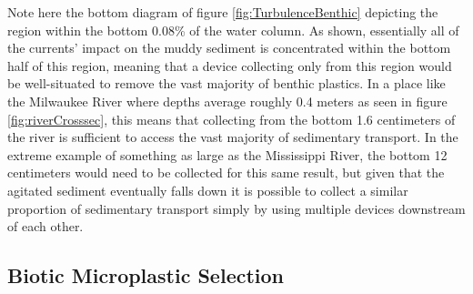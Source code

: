 \documentclass[fleqn,10pt]{SelfArx} %
\begin{document}
	Note here the bottom diagram of figure \ref{fig:TurbulenceBenthic} depicting the region within the bottom 0.08\% of the water column. As shown, essentially all of the currents’ impact on the muddy sediment is concentrated within the bottom half of this region, meaning that a device collecting only from this region would be well-situated to remove the vast majority of benthic plastics. In a place like the Milwaukee River where depths average roughly 0.4 meters as seen in figure \ref{fig:riverCrosssec}, this means that collecting from the bottom 1.6 centimeters of the river is sufficient to access the vast majority of sedimentary transport. In the extreme example of something as large as the Mississippi River, the bottom 12 centimeters would need to be collected for this same result, but given that the agitated sediment eventually falls down it is possible to collect a similar proportion of sedimentary transport simply by using multiple devices downstream of each other.
	
	
	\subsection{Biotic Microplastic Selection}
	
\end{document}
